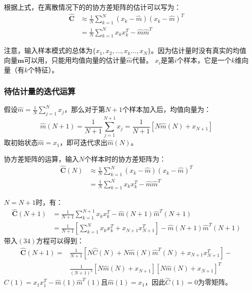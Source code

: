 \documentclass[12pt, letterpaper]{article}
\begin{document}
根据上式，在离散情况下的的协方差矩阵的估计可以写为：
\begin{equation}
\begin{aligned}
\mathbf{\hat{C}}&\approx \frac{1}{N}\sum_{k=1}^{N}(x_k-\hat{m})(x_k-\hat{m})^T\\
&=\frac{1}{N}\sum_{k=1}^{N}x_kx_k^T-\hat{m}\hat{m}^T
\end{aligned}
\end{equation}

注意，输入样本模式的总体为$\{x_1,x_2,\ldots,x_k\ldots,x_N \}$。因为估计量时没有真实的均值向量$\mathbf{m}$可以用，只能用均值向量的估计量$\hat{m}$代替。
$x_i$是第$i$个样本，它是一个$k$维向量（有$k$个特征）。
\subsubsection*{待估计量的迭代运算}
假设$\hat{m}=\frac{1}{N}\sum_{j=1}^{N}x_j$，那么对于第$N+1$个样本加入后，均值向量为：
\begin{equation}
\hat{m}(N+1)=\frac{1}{N+1}\sum_{j=1}^{N+1}x_j=\frac{1}{N+1}\left[N\hat{m}(N)+x_{N+1}\right]
\end{equation}
取初始状态$\hat{m}=x_1$，即可迭代求出$\hat{m}(N)$。

协方差矩阵的运算，输入$N$个样本时的协方差矩阵为：
\begin{equation}
\begin{aligned}
\mathbf{\hat{C}}(N)&\approx \frac{1}{N}\sum_{k=1}^{N}(x_k-\hat{m})(x_k-\hat{m})^T\\
&=\frac{1}{N}\sum_{k=1}^{N}x_kx_k^T-\hat{m}\hat{m}^T
\end{aligned}
\end{equation}

$N=N+1$时，有：
\begin{equation}
\begin{aligned}
\mathbf{\hat{C}}(N+1)&=\frac{1}{N+1}\sum_{k=1}^{N+1}x_kx_k^T-\hat{m}(N+1)\hat{m}^T(N+1)\\
&=\frac{1}{N+1}\left[\sum_{k=1}^{N}x_kx_k^T+x_{N+1}x_{N+1}^T\right]-\hat{m}(N+1)\hat{m}^T(N+1)
\end{aligned}
\end{equation}
带入$(34)$方程可以得到：
\begin{equation}
\begin{aligned}
\mathbf{\hat{C}}(N+1)=&\frac{1}{N+1}\left[N\hat{C}(N)+N\hat{m}(N)\hat{m}^T(N)+x_{N+1}x^T_{N+1}\right]-\\
&\frac{1}{(N+1)^2}\left[N\hat{m}(N)+x_{N+1}\right]\left[N\hat{m}(N)+x_{N+1}\right]^T
\end{aligned}
\end{equation}
$\hat{C}(1)=x_1x_1^T-\hat{m}(1)\hat{m}^T(1)$且$\hat{m}(1)=x_1$，因此$\hat{C}(1)=0$为零矩阵。
\end{document}
